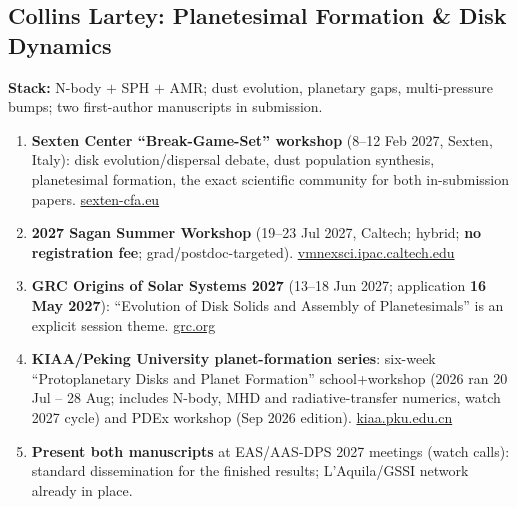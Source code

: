 \documentclass[11pt,a4paper]{article}
\begin{document}
\subsection{Collins Lartey: Planetesimal Formation \& Disk Dynamics}
\textbf{Stack:} N-body $+$ SPH $+$ AMR; dust evolution, planetary gaps, multi-pressure bumps; two first-author manuscripts in submission.
\begin{enumerate}[leftmargin=1.6em]
  \item \textbf{Sexten Center ``Break-Game-Set'' workshop} (8--12 Feb 2027, Sexten, Italy): disk evolution/dispersal debate, dust population synthesis, planetesimal formation, the exact scientific community for both in-submission papers. \href{https://www.sexten-cfa.eu/event/bgs27/}{sexten-cfa.eu}
  \item \textbf{2027 Sagan Summer Workshop} (19--23 Jul 2027, Caltech; hybrid; \textbf{no registration fee}; grad/postdoc-targeted). \href{https://vmnexsci.ipac.caltech.edu/workshop/2027/}{vmnexsci.ipac.caltech.edu}
  \item \textbf{GRC Origins of Solar Systems 2027} (13--18 Jun 2027; application \textbf{16 May 2027}): ``Evolution of Disk Solids and Assembly of Planetesimals'' is an explicit session theme. \href{https://www.grc.org/origins-of-solar-systems-conference/2027/}{grc.org}
  \item \textbf{KIAA/Peking University planet-formation series}: six-week ``Protoplanetary Disks and Planet Formation'' school+workshop (2026 ran 20 Jul -- 28 Aug; includes N-body, MHD and radiative-transfer numerics, watch 2027 cycle) and PDEx workshop (Sep 2026 edition). \href{https://kiaa.pku.edu.cn/info/1031/11282.htm}{kiaa.pku.edu.cn}
  \item \textbf{Present both manuscripts} at EAS/AAS-DPS 2027 meetings (watch calls): standard dissemination for the finished results; L'Aquila/GSSI network already in place.
\end{enumerate}
\end{document}
